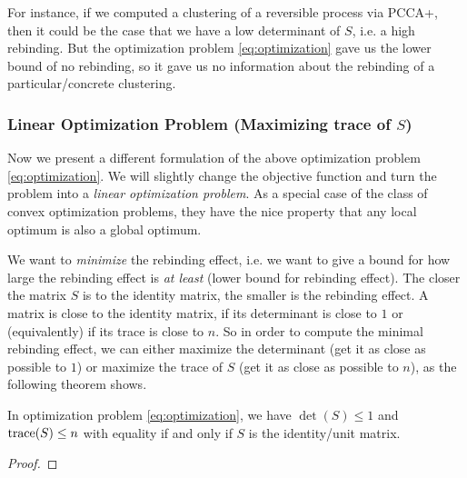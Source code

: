 For instance, if we computed a clustering of a reversible process via PCCA+, then it could be the case that we have a low determinant of $S$, i.e. a high rebinding. But the optimization problem \eqref{eq:optimization} gave us the lower bound of no rebinding, so it gave us no information about the rebinding of a particular/concrete clustering.

\subsubsection*{Linear Optimization Problem (Maximizing trace of $S$)}
Now we present a different formulation of the above optimization problem \eqref{eq:optimization}. We will slightly change the objective function and turn the problem into a \textit{linear optimization problem}.
As a special case of the class of convex optimization problems, they have the nice property that any local optimum is also a global optimum. 

We want to \textit{minimize} the rebinding effect, i.e. we want to give a bound for how large the rebinding effect is \textit{at least} (lower bound for rebinding effect). The closer the matrix $S$ is to the identity matrix, the smaller is the rebinding effect.
A matrix is close to the identity matrix, if its determinant is close to $1$ or (equivalently) if its trace is close to $n$.
So in order to compute the minimal rebinding effect, we can either maximize the determinant (get it as close as possible to $1$) or maximize the trace of $S$ (get it as close as possible to $n$), as the following theorem shows.
\begin{thm}
In optimization problem \eqref{eq:optimization}, we have $\det(S) \leq 1$ and $\mathrm{trace}(S) \leq n$ with equality if and only if $S$ is the identity/unit matrix.
\end{thm}
\begin{proof}
\end{proof}

